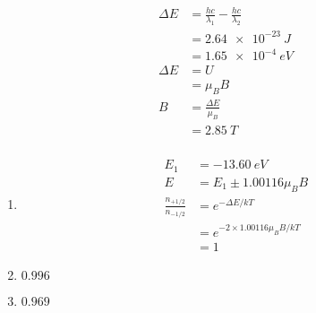 \documentclass{article}
\begin{document}
\setcounter{subsubsection}{54}
\subsubsection{}

\begin{align*}
  \Delta E & = \frac{h c}{\lambda_1} - \frac{h c}{\lambda_2} \\
           & = \qty{2.64e-23}{J}                             \\
           & = \qty{1.65e-4}{eV}                             \\
  \Delta E & = U                                             \\
           & = \mu_B B                                       \\
  B        & = \frac{\Delta E}{\mu_B}                        \\
           & = \qty{2.85}{T}
\end{align*}

\setcounter{subsubsection}{56}
\subsubsection{}

\begin{enumerate}
  \item

        \begin{align*}
          E_1                           & = \qty{-13.60}{eV}                    \\
          E                             & = E_1 \pm 1.00116 \mu_B B             \\
          \frac{n_{+1 / 2}}{n_{-1 / 2}} & = e^{-\Delta E / k T}                 \\
                                        & = e^{-2 \times 1.00116 \mu_B B / k T} \\
                                        & = 1
        \end{align*}

  \item $0.996$

  \item $0.969$
\end{enumerate}

\setcounter{subsubsection}{60}
\subsubsection{}
\end{document}
